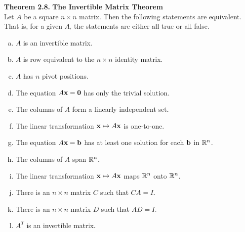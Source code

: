 \begin{boxthm}
	\textbf{Theorem 2.8.}
	\textbf{The Invertible Matrix Theorem} \\
	Let $A$ be a square $n\times n$ matrix. Then the following statements are equivalent. That is, for a given $A$, the statements are either all true or all false.
	\begin{enumerate}[(a)]\itemsep0em 
		\item $A$ is an invertible matrix.
		\item $A$ is row equivalent to the $n\times n$ identity matrix.
		\item $A$ has $n$ pivot positions.
		\item The equation $A\boldsymbol{\mathbf{x}}=\boldsymbol{\mathbf{0}}$ has only the trivial solution.
		\item The columns of $A$ form a linearly independent set.
		\item The linear transformation $\boldsymbol{\mathbf{x}}\mapsto A\boldsymbol{\mathbf{x}}$ is one-to-one.
		\item The equation $A\boldsymbol{\mathbf{x}}=\boldsymbol{\mathbf{b}}$ has at least one solution for each $\boldsymbol{\mathbf{b}}$ in $\mathbb{R}^n$.
		\item The columns of $A$ span $\mathbb{R}^n$.
		\item The linear transformation $\boldsymbol{\mathbf{x}}\mapsto A\boldsymbol{\mathbf{x}}$ maps $\mathbb{R}^n$ onto $\mathbb{R}^n$.
		\item There is an $n\times n$ matrix $C$ such that $CA=I$.
		\item There is an $n\times n$ matrix $D$ such that $AD=I$.
		\item $A^T$ is an invertible matrix.
	\end{enumerate}
\end{boxthm}

